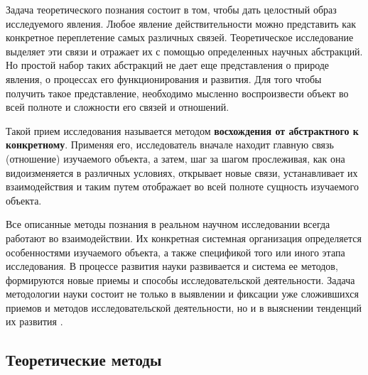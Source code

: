 Задача теоретического познания состоит в том, чтобы дать целостный образ исследуемого явления. Любое явление действительности можно представить как конкретное переплетение самых различных связей. Теоретическое исследование выделяет эти связи и отражает их с помощью определенных научных абстракций. Но простой набор таких абстракций не дает еще представления о природе явления, о процессах его функционирования и развития. Для того чтобы получить такое представление, необходимо мысленно воспроизвести объект во всей полноте и сложности его связей и отношений.

Такой прием исследования называется методом \textbf{восхождения от абстрактного к конкретному}. Применяя его, исследователь вначале находит главную связь (отношение) изучаемого объекта, а затем, шаг за шагом прослеживая, как она видоизменяется в различных условиях, открывает новые связи, устанавливает их взаимодействия и таким путем отображает во всей полноте сущность изучаемого объекта.

Все описанные методы познания в реальном научном исследовании всегда работают во взаимодействии. Их конкретная системная организация определяется особенностями изучаемого объекта, а также спецификой того или иного этапа исследования. В процессе развития науки развивается и система ее методов, формируются новые приемы и способы исследовательской деятельности. Задача методологии науки состоит не только в выявлении и фиксации уже сложившихся приемов и методов исследовательской деятельности, но и в выяснении тенденций их развития \cite{mir:philosophy}.

\subsection{Теоретические методы}

